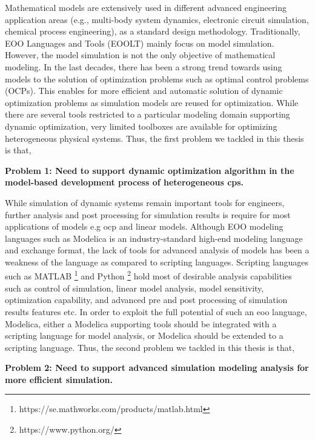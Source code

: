 Mathematical models are extensively used in different advanced engineering application areas (e.g., multi-body system dynamics, electronic circuit simulation, chemical process engineering), as a standard design methodology. Traditionally, EOO Languages and Tools (EOOLT) mainly focus on model simulation. However, the model simulation is not the only objective of mathematical modeling. In the last decades, there has been a strong trend towards using models to the solution of optimization problems such as optimal control problems (OCPs). This enables for more efficient and automatic solution of dynamic optimization problems as simulation models are reused for optimization. While there are several tools restricted to a particular modeling domain supporting dynamic optimization, very limited toolboxes are available for optimizing heterogeneous physical systems. Thus, the first problem we tackled in this thesis is that, 

\begin{description}
	
\item \textbf{Problem 1: Need to support dynamic optimization algorithm in the model-based development process of heterogeneous \acrshort{cps}.}

\end{description}

While simulation of dynamic systems remain important tools for engineers, further analysis and post processing for simulation results is require for most applications of models e.g \acrshort{ocp} and linear models. Although EOO modeling languages such as Modelica is an industry-standard high-end modeling language and exchange format, the lack of tools for advanced analysis of models has been a weakness of the language as compared to scripting languages. Scripting languages such as MATLAB \footnote{https://se.mathworks.com/products/matlab.html} and Python \footnote{https://www.python.org/} hold most of desirable analysis capabilities such as control of simulation, linear model analysis, model sensitivity, optimization capability, and advanced pre and post processing of simulation results features etc. In order to exploit the full potential of such an \acrshort{eoo} language, Modelica, either a Modelica supporting tools should be integrated with a scripting language for model analysis, or Modelica should be extended to a scripting language. Thus, the second problem we tackled in this thesis is that,

\begin{description}

\item \textbf{Problem 2: Need to support advanced simulation modeling analysis for more efficient simulation.}

\end{description}

